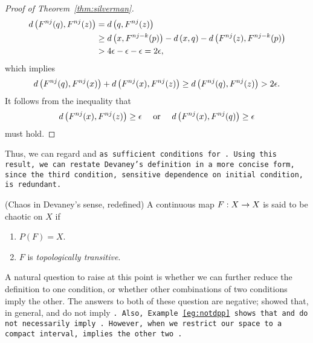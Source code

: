 \documentclass[10pt,draft,twoside]{book}
\begin{document}
\begin{proof}[Proof of Theorem~\ref{thm:silverman}]
\begin{align*}
    d\left( F^{nj}(q), F^{nj}(z) \right) 
    &= d\left( q, F^{nj}(z) \right)  \\
    &\geq  d\left( x, F^{nj-k}(p) \right) - d\left( x,q \right) - d\left( F^{nj}(z), F^{nj - k}(p) \right)  \\
    &> 4\epsilon - \epsilon - \epsilon 
    = 2\epsilon,
  \end{align*}
  which implies
  \begin{equation*}
    d\left( F^{nj}(q), F^{nj}(x) \right) + d\left( F^{nj}(x), F^{nj}(z) \right) 
    \geq d\left( F^{nj}(q), F^{nj}(z) \right)
    > 2\epsilon.
  \end{equation*}
  It follows from the inequality that 
  \begin{equation*}
    d\left( F^{nj}(x), F^{nj}(z) \right) \geq \epsilon \quad\mbox{ or }\quad d\left( F^{nj}(x), F^{nj}(q) \right) \geq \epsilon 
  \end{equation*}
  must hold.
\end{proof}

Thus, we can regard \dpp and \tt as sufficient conditions for \sdic.
Using this result, we can restate Devaney's definition in a more concise form, since the third condition, sensitive dependence on initial condition, is redundant.
\begin{definition}
  (Chaos in Devaney's sense, redefined) 
  A continuous map $F: X\rightarrow X$ is said to be chaotic on $X$ if
  \begin{enumerate}
    \item $P(F) = X$.
    \item $F$ is \textit{topologically transitive}.
  \end{enumerate}
\end{definition}
A natural question to raise at this point is whether we can further reduce the definition to one condition, or whether other combinations of two conditions imply the other.
The answers to both of these question are negative; \citet{assaf} showed that, in general, \dpp and \sdic do not imply \tt.
Also, Example~\ref{eg:notdpp} shows that \sdic and \tt do not necessarily imply \dpp.
However, when we restrict our space to a compact interval, \tt implies the other two \citep{silverman}.
\end{document}
